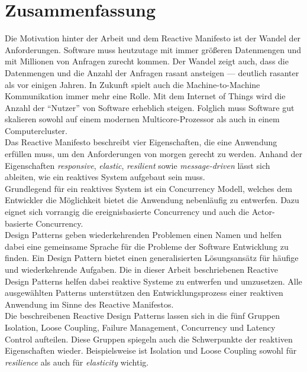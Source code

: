 \section{Zusammenfassung}
Die Motivation hinter der Arbeit und dem Reactive Manifesto ist der Wandel der Anforderungen. Software muss heutzutage mit immer größeren Datenmengen und mit Millionen von Anfragen zurecht kommen. Der Wandel zeigt auch, dass die Datenmengen und die Anzahl der Anfragen rasant ansteigen --- deutlich rasanter als vor einigen Jahren. In Zukunft spielt auch die Machine-to-Machine Kommunikation immer mehr eine Rolle. Mit dem Internet of Things wird die Anzahl der \enquote{Nutzer} von Software erheblich steigen. Folglich muss Software gut skalieren sowohl auf einem modernen Multicore-Prozessor als auch in einem Computercluster.\\
Das Reactive Manifesto beschreibt vier Eigenschaften, die eine Anwendung erfüllen muss, um den Anforderungen von morgen gerecht zu werden. Anhand der Eigenschaften \textit{responsive}, \textit{elastic}, \textit{resilient} sowie \textit{message-driven} lässt sich ableiten, wie ein reaktives System aufgebaut sein muss.\\
Grundlegend für ein reaktives System ist ein Concurrency Modell, welches dem Entwickler die Möglichkeit bietet die Anwendung nebenläufig zu entwerfen. Dazu eignet sich vorrangig die ereignisbasierte Concurrency und auch die Actor-basierte Concurrency.\\
Design Patterns geben wiederkehrenden Problemen einen Namen und helfen dabei eine gemeinsame Sprache für die Probleme der Software Entwicklung zu finden. Ein Design Pattern bietet einen generalisierten Lösungsansätz für häufige und wiederkehrende Aufgaben. Die in dieser Arbeit beschriebenen Reactive Design Patterns helfen dabei reaktive Systeme zu entwerfen und umzusetzen. Alle ausgewählten Patterns unterstützen den Entwicklungsprozess einer reaktiven Anwendung im Sinne des Reactive Manifestos.\\
Die beschreibenen Reactive Design Patterns lassen sich in die fünf Gruppen Isolation, Loose Coupling, Failure Management, Concurrency und Latency Control aufteilen. Diese Gruppen spiegeln auch die Schwerpunkte der reaktiven Eigenschaften wieder. Beispielsweise ist Isolation und Loose Coupling sowohl für \textit{resilience} als auch für \textit{elasticity} wichtig.\\

